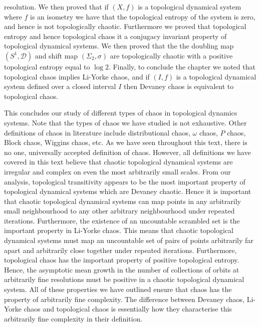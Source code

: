 resolution. We then proved that if $(X, f)$ is a topological dynamical system where $f$ is an isometry we have that the topological entropy of the system is zero, and hence is not topologically chaotic. Furthermore we proved that topological entropy and hence topological chaos it a conjugacy invariant property of topological dynamical systems. We then proved that the the doubling map $(S^1, \mathcal{D})$ and shift map $(\Sigma_2, \sigma)$ are topologically chaotic with a positive topological entropy equal to $\log 2$. Finally, to conclude the chapter we noted that topological chaos implies Li-Yorke chaos, and if $(I, f)$ is a topological dynamical system defined over a closed interval $I$ then Devaney chaos is equivalent to topological chaos.

This concludes our study of different types of chaos in topological dynamics systems. Note that the types of chaos we have studied is not exhaustive. Other definitions of chaos in literature include distributional chaos, $\omega$ chaos, $P$ chaos, Block chaos, Wiggins chaos, etc. As we have seen throughout this text, there is no one,  universally accepted definition of chaos. However, all definitions we have covered in this text believe that chaotic topological dynamical systems are irregular and complex on even the most arbitrarily small scales. From our analysis, topological transitivity appears to be the most important property of topological dynamical systems which are Devaney chaotic. Hence it is important that chaotic topological dynamical systems can map points in any arbitrarily small neighbourhood to any other arbitrary neighbourhood under repeated iterations. Furthermore, the existence of an uncountable scrambled set is the important property in Li-Yorke chaos. This means that chaotic topological dynamical systems must map an uncountable set of pairs of points arbitrarily far apart and arbitrarily close together under repeated iterations. Furthermore, topological chaos has the important property of positive topological entropy. Hence, the asymptotic mean growth in the number of collections of orbits at arbitrarily fine resolutions must be positive in a chaotic topological dynamical system. All of these properties we have outlined ensure that chaos has the property of arbitrarily fine complexity. The difference between Devaney chaos, Li-Yorke chaos and topological chaos is essentially how they characterise this arbitrarily fine complexity in their definition.
